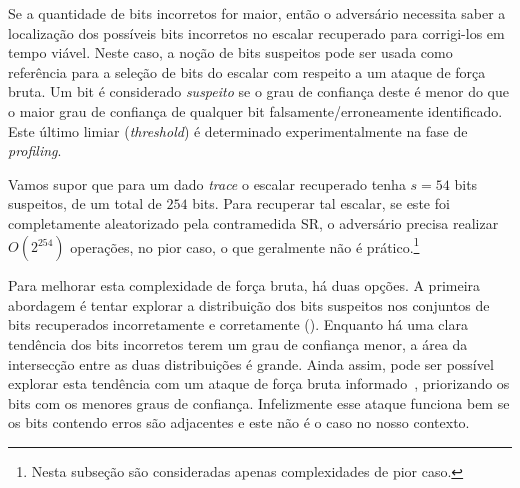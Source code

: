 \documentclass{SBCbookchapter}
\begin{document}
%
%
Se a quantidade de bits incorretos for maior, então o adversário necessita saber a localização dos possíveis bits incorretos no escalar recuperado para corrigi-los em tempo viável.
%
%
Neste caso, a noção de bits suspeitos pode ser usada como referência para a seleção de bits do escalar com respeito a um ataque de força bruta. Um bit é considerado \textit{suspeito} se o grau de confiança deste é menor do que o maior grau de confiança de qualquer bit falsamente/erroneamente identificado. Este último limiar (\emph{threshold}) é determinado experimentalmente na fase de \emph{profiling}.
%

\newcommand{\scalarlen}{254}

Vamos supor que para um dado \emph{trace} o escalar recuperado tenha $s=54$ bits suspeitos, de um total de $\scalarlen$ bits.
Para recuperar tal escalar, se este foi completamente aleatorizado pela contramedida SR, o adversário precisa realizar $O(2^{\scalarlen})$ operações, no pior caso, o que geralmente não é prático.\footnote{Nesta subseção são consideradas apenas complexidades de pior caso.}


Para melhorar esta complexidade de força bruta, há duas opções.
A primeira abordagem é tentar explorar a distribuição dos bits suspeitos nos conjuntos de bits recuperados incorretamente e corretamente (). Enquanto há uma clara tendência dos bits incorretos terem um grau de confiança menor, a área da intersecção entre as duas distribuições é grande.
Ainda assim, pode ser possível explorar esta tendência com um ataque de força bruta informado~\cite{LangeVredendaalWakker2014}, priorizando os bits com os menores graus de confiança.
Infelizmente esse ataque funciona bem se os bits contendo erros são adjacentes e este não é o caso no nosso contexto.
\end{document}
